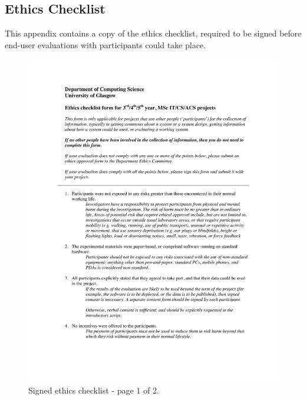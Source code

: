 \documentclass{l4proj}
\begin{document}
\begin{appendices}

\chapter{Ethics Checklist}
\label{appendix:ethics}

This appendix contains a copy of the ethics checklist, required to be signed before end-user evaluations with participants could take place.

\begin{figure}[htb]
    \centering
    \includegraphics[width=0.85\linewidth]{images/signed_ethics_checklist_1.pdf}    
    \caption{Signed ethics checklist - page 1 of 2.}
    \label{fig:signed_ethics_checklist_1} 
\end{figure}


\end{appendices}
\end{document}
